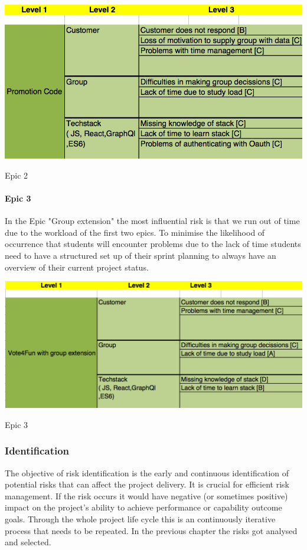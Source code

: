 \begin{table}[H]
  \includegraphics[width=\linewidth]{images/diagrams/promotioncode.png}
  \caption{Epic 2}
\end{table}

\paragraph{Epic 3}
In the Epic "Group extension" the most influential risk is that we run out of time due to the workload of the first two epics. To minimise the likelihood of occurrence that students will encounter problems due to the lack of time students need to have a structured set up of their sprint planning to always have an overview of their current project status.

\begin{table}[H]
  \includegraphics[width=\linewidth]{images/diagrams/groupextension.png}
  \caption{Epic 3}
\end{table}

\subsubsection{Identification}
\label{sssec:identification}

The objective of risk identification is the early and continuous identification of potential risks that can affect the project delivery. It is crucial for efficient risk management. If the risk occurs it would have negative (or sometimes positive) impact on the project's ability to achieve performance or capability outcome goals. Through the whole project life cycle this is an continuously iterative process that needs to be repeated. In the previous chapter the risks got analysed and selected. 


